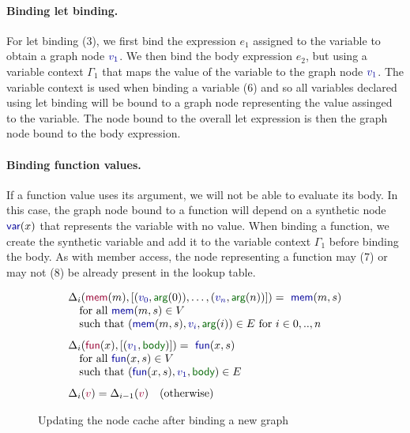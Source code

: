 \documentclass[sigplan,10pt]{acmart}\settopmatter{printfolios=true,printccs=false,printacmref=false}
\theoremstyle{plain}
\theoremstyle{definition}
\newcommand{\kvd}[1]{\textnormal{\textcolor{kvdclr}{\sffamily #1}}}
\newcommand{\bndclr}[1]{\textcolor{kvdclr}{#1}}
\newcommand{\bkndclr}[1]{\textcolor{prepclr}{#1}}
\newcommand{\bnd}[1]{\textnormal{\textcolor{kvdclr}{\sffamily #1}}}
\newcommand{\bknd}[1]{\textnormal{\textcolor{prepclr}{\sffamily #1}}}
\newcommand{\blbl}[1]{\textnormal{\textcolor{numclr}{\sffamily #1}}}
\begin{document}
\paragraph{Binding let binding.} For \kvd{let} binding (3), we first bind the expression $e_1$ assigned
to the variable to obtain a graph node $\bndclr{v_1}$. We then bind the body expression $e_2$,
but using a variable context $\Gamma_1$ that maps the value of the variable to the graph node
$\bndclr{v_1}$. The variable context is used when binding a variable (6) and so all variables 
declared using \kvd{let} binding will be bound to a graph node representing the value assinged 
to the variable. The node bound to the overall \kvd{let} expression is then the graph node bound
to the body expression.

\paragraph{Binding function values.} If a function value uses its argument, we will not be able
to evaluate its body. In this case, the graph node bound to a function will depend on a synthetic
node $\bnd{var}(x)$ that represents the variable with no value. When binding a function, we 
create the synthetic variable and add it to the variable context $\Gamma_1$ before binding the
body. As with member access, the node representing a function may (7) or may not (8) be already 
present in the lookup table.


\begin{figure}[!b]
\vspace{-0.5em}
\begin{equation*}
\begin{array}{l}
\Delta_{i}(\bknd{mem}(m), [(\bndclr{v_0},\blbl{arg}(0)),\ldots, (\bndclr{v_n},\blbl{arg}(n))]) = \bnd{mem}(m, s)\\
\quad \textnormal{for all}~\bnd{mem}(m, s) \in V\\
\quad \textnormal{such that}~(\bnd{mem}(m, s), \bndclr{v_i}, \blbl{arg}(i)) \in E~\textnormal{for}~i\in 0,..,n
\\[0.75em]
\Delta_{i}(\bknd{fun}(x), [(\bndclr{v_1},\blbl{body})]) = \bnd{fun}(x, s)\\
\quad \textnormal{for all}~\bnd{fun}(x, s) \in V\\
\quad \textnormal{such that}~(\bnd{fun}(x, s), \bndclr{v_1}, \blbl{body}) \in E
\\[0.75em]
\Delta_{i}(\bkndclr{v}) = \Delta_{i-1}(\bkndclr{v})\quad \textnormal{(otherwise)}
\end{array}
\end{equation*}
\vspace{-0.5em}
\caption{Updating the node cache after binding a new graph}
\label{fig:loop}
\end{figure}
\end{document}
